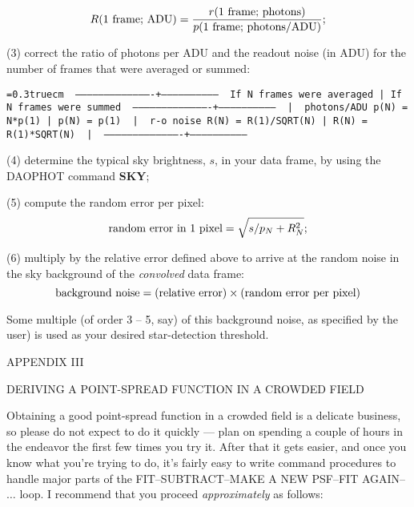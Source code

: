 $$
R(\hbox{\rm 1 frame; ADU}) = {r(\hbox{\rm 1 frame; photons}) \over
p(\hbox{\rm 1 frame; photons/ADU})};$$

\item{(3)} correct the ratio of photons per ADU and the readout noise
(in ADU) for the number of frames that were averaged or summed:

\bigskip
{\noindent\obeylines\obeyspaces\frenchspacing\tt\baselineskip=0.3truecm
\ ----------------------------------------+-----------------------------
\               If N frames were averaged |  If N frames were summed
\ ----------------------------------------+-----------------------------
\                                         |
\ photons/ADU   p(N) = N*p(1)             |  p(N) = p(1)
\                                         |
\ r-o noise     R(N) = R(1)/SQRT(N)       |  R(N) = R(1)*SQRT(N)
\                                         |
\ ----------------------------------------+-----------------------------
}
\bigskip

\item{(4)} determine the typical sky brightness, $s$, in your data
frame, by using the DAOPHOT command {\bf SKY};

\item{(5)} compute the random error per pixel:
$$ \hbox{\rm random error in 1 pixel} = \sqrt{s/p_N + R_N^2};$$

\item{(6)} multiply by the relative error defined above to arrive at the
random noise in the sky background of the {\it convolved\/} data frame:
$$
\hbox{\rm background noise} = (\hbox{\rm relative error}) \times
(\hbox{\rm random error per pixel})
$$

Some multiple (of order 3 -- 5, say) of this background noise, as
specified by the user) is used as your desired star-detection threshold.

\vfill
\eject
\centerline {APPENDIX III}
\bigskip
\centerline{DERIVING A POINT-SPREAD FUNCTION IN A CROWDED FIELD}
\bigskip

Obtaining a good point-spread function in a crowded field is a delicate
business, so please do not expect to do it quickly --- plan on spending
a couple of hours in the endeavor the first few times you try it.
After that it gets easier, and once you know what you're trying to do,
it's fairly easy to write command procedures to handle major parts of
the FIT--SUBTRACT--MAKE A NEW PSF--FIT AGAIN--$\ldots$ loop.  I
recommend that you proceed {\it approximately} as follows:

